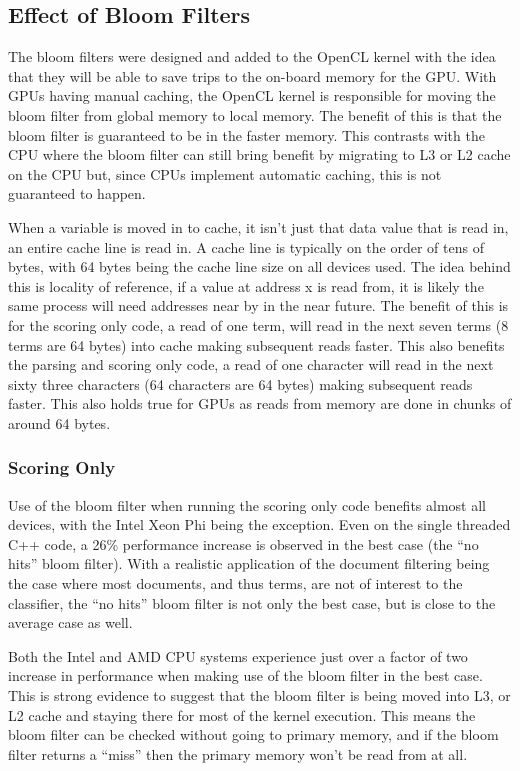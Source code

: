 \subsection{Effect of Bloom Filters}

The bloom filters were designed and added to the OpenCL kernel with the idea
that they will be able to save trips to the on-board memory for the GPU. With
GPUs having manual caching, the OpenCL kernel is responsible for moving the
bloom filter from global memory to local memory. The benefit of this is that the
bloom filter is guaranteed to be in the faster memory. This contrasts with the
CPU where the bloom filter can still bring benefit by migrating to L3 or L2
cache on the CPU but, since CPUs implement automatic caching, this is not
guaranteed to happen.

When a variable is moved in to cache, it isn't just that data value that is read
in, an entire cache line is read in. A cache line is typically on the order of
tens of bytes, with 64 bytes being the cache line size on all devices used. The
idea behind this is locality of reference, if a value at address x is read from,
it is likely the same process will need addresses near by in the near future.
The benefit of this is for the scoring only code, a read of one term, will read
in the next seven terms (8 terms are 64 bytes) into cache making subsequent
reads faster. This also benefits the parsing and scoring only code, a read of
one character will read in the next sixty three characters (64 characters are 64
bytes) making subsequent reads faster. This also holds true for GPUs as reads
from memory are done in chunks of around 64 bytes.

\subsubsection{Scoring Only}

Use of the bloom filter when running the scoring only code benefits almost all
devices, with the Intel Xeon Phi being the exception. Even on the single
threaded C++ code, a 26\% performance increase is observed in the best case (the
``no hits'' bloom filter). With a realistic application of the document
filtering being the case where most documents, and thus terms, are not of
interest to the classifier, the ``no hits'' bloom filter is not only the best
case, but is close to the average case as well.

Both the Intel and AMD CPU systems experience just over a factor of two increase
in performance when making use of the bloom filter in the best case. This is
strong evidence to suggest that the bloom filter is being moved into L3, or L2
cache and staying there for most of the kernel execution. This means the bloom
filter can be checked without going to primary memory, and if the bloom filter
returns a ``miss'' then the primary memory won't be read from at all.

